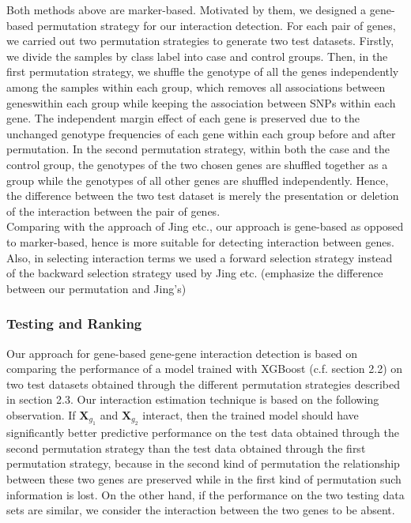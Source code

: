 \documentclass[11pt]{article}
\theoremstyle{plain}
\theoremstyle{definition}
\theoremstyle{remark}
\begin{document}
Both methods above are marker-based. Motivated by them, we designed a gene-based permutation
strategy for our interaction detection. For each pair of genes, we carried out two permutation
strategies to generate two test datasets. Firstly, we divide the samples by class label into case and
control groups. Then, in the first permutation strategy, we shuffle the genotype of all the genes
independently among the samples within each group, which removes all associations between geneswithin each group while keeping the association between SNPs within each gene. The independent
margin effect of each gene is preserved due to the unchanged genotype frequencies of each gene
within each group before and after permutation. In the second permutation strategy, within both the
case and the control group, the genotypes of the two chosen genes are shuffled together as a group
while the genotypes of all other genes are shuffled independently. Hence, the difference between
the two test dataset is merely the presentation or deletion of the interaction between the pair of genes.\\

Comparing with the approach of Jing etc., our approach is gene-based as opposed to marker-based,
hence is more suitable for detecting interaction between genes. Also, in selecting interaction terms
we used a forward selection strategy instead of the backward selection strategy used by Jing etc.
(emphasize the difference between our permutation and Jing’s)

\subsubsection{Testing and Ranking}

Our approach for gene-based gene-gene interaction detection is based on comparing the
performance of a model trained with XGBoost (c.f. section 2.2) on two test datasets obtained
through the different permutation strategies described in section 2.3. Our interaction estimation
technique is based on the following observation. If $\mathbf{X}_{g_1}$ and $\mathbf{X}_{g_2}$ interact, then the trained model
should have significantly better predictive performance on the test data obtained through the second
permutation strategy than the test data obtained through the first permutation strategy, because in
the second kind of permutation the relationship between these two genes are preserved while in the
first kind of permutation such information is lost. On the other hand, if the performance on the two
testing data sets are similar, we consider the interaction between the two genes to be absent.\\
\end{document}
